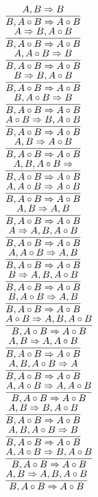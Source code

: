 \documentclass[11pt]{article}
\begin{document}
\begin{center}
\bigskip
\\$\infer{B, A\circ B\Rightarrow A\circ B}{A, B\Rightarrow B}$
\bigskip
\\$\infer{B, A\circ B\Rightarrow A\circ B}{A\Rightarrow B, A\circ B}$
\bigskip
\\$\infer{B, A\circ B\Rightarrow A\circ B}{A, A\circ B\Rightarrow B}$
\bigskip
\\$\infer{B, A\circ B\Rightarrow A\circ B}{B\Rightarrow B, A\circ B}$
\bigskip
\\$\infer{B, A\circ B\Rightarrow A\circ B}{B, A\circ B\Rightarrow B}$
\bigskip
\\$\infer{B, A\circ B\Rightarrow A\circ B}{A\circ B\Rightarrow B, A\circ B}$
\bigskip
\\$\infer{B, A\circ B\Rightarrow A\circ B}{A, B\Rightarrow A\circ B}$
\bigskip
\\$\infer{B, A\circ B\Rightarrow A\circ B}{A, B, A\circ B\Rightarrow }$
\bigskip
\\$\infer{B, A\circ B\Rightarrow A\circ B}{A, A\circ B\Rightarrow A\circ B}$
\bigskip
\\$\infer{B, A\circ B\Rightarrow A\circ B}{A, B\Rightarrow A, B}$
\bigskip
\\$\infer{B, A\circ B\Rightarrow A\circ B}{A\Rightarrow A, B, A\circ B}$
\bigskip
\\$\infer{B, A\circ B\Rightarrow A\circ B}{A, A\circ B\Rightarrow A, B}$
\bigskip
\\$\infer{B, A\circ B\Rightarrow A\circ B}{B\Rightarrow A, B, A\circ B}$
\bigskip
\\$\infer{B, A\circ B\Rightarrow A\circ B}{B, A\circ B\Rightarrow A, B}$
\bigskip
\\$\infer{B, A\circ B\Rightarrow A\circ B}{A\circ B\Rightarrow A, B, A\circ B}$
\bigskip
\\$\infer{B, A\circ B\Rightarrow A\circ B}{A, B\Rightarrow A, A\circ B}$
\bigskip
\\$\infer{B, A\circ B\Rightarrow A\circ B}{A, B, A\circ B\Rightarrow A}$
\bigskip
\\$\infer{B, A\circ B\Rightarrow A\circ B}{A, A\circ B\Rightarrow A, A\circ B}$
\bigskip
\\$\infer{B, A\circ B\Rightarrow A\circ B}{A, B\Rightarrow B, A\circ B}$
\bigskip
\\$\infer{B, A\circ B\Rightarrow A\circ B}{A, B, A\circ B\Rightarrow B}$
\bigskip
\\$\infer{B, A\circ B\Rightarrow A\circ B}{A, A\circ B\Rightarrow B, A\circ B}$
\bigskip
\\$\infer{B, A\circ B\Rightarrow A\circ B}{A, B\Rightarrow A, B, A\circ B}$

\end{center}
\end{document}
